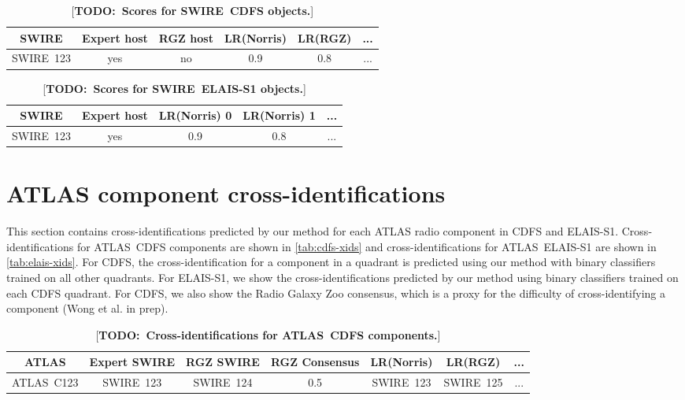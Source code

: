 \documentclass[fleqn,usenatbib,usedcolumn]{mnras}
\newcommand{\todo}[1]{ {\color{red}[{\bf TODO:~{#1}}]} }
\begin{document}
  \begin{table}
    \caption{\todo{Scores for SWIRE~CDFS objects.}}
    \label{tab:cdfs-scores}
    \begin{tabular}{cccccc}
      \hline
      SWIRE & Expert host & RGZ host & LR(Norris) & LR(RGZ) & ... \\
      \hline
      SWIRE~123 & yes & no & 0.9 & 0.8 & ... \\
      \hline
    \end{tabular}
  \end{table}

  \begin{table}
    \caption{\todo{Scores for SWIRE~ELAIS-S1 objects.}}
    \label{tab:elais-scores}
    \begin{tabular}{ccccc}
      \hline
      SWIRE & Expert host & LR(Norris) 0 & LR(Norris) 1 & ... \\
      \hline
      SWIRE~123 & yes & 0.9 & 0.8 & ... \\
      \hline
    \end{tabular}
  \end{table}

\section{ATLAS component cross-identifications}\label{app:xids}
  
  This section contains cross-identifications predicted by our method for each
  ATLAS radio component in CDFS and ELAIS-S1. Cross-identifications for
  ATLAS~CDFS components are shown in \autoref{tab:cdfs-xids} and
  cross-identifications for ATLAS~ELAIS-S1 are shown in
  \autoref{tab:elais-xids}. For CDFS, the cross-identification for a component
  in a quadrant is predicted using our method with binary classifiers trained
  on all other quadrants. For ELAIS-S1, we show the cross-identifications
  predicted by our method using binary classifiers trained on each CDFS
  quadrant. For CDFS, we also show the Radio Galaxy Zoo consensus, which is a
  proxy for the difficulty of cross-identifying a component (Wong et al. in
  prep).

  \begin{table}
    \caption{\todo{Cross-identifications for ATLAS~CDFS components.}}
    \label{tab:cdfs-xids}
    \begin{tabular}{ccccccc}
      \hline
      ATLAS & Expert SWIRE & RGZ SWIRE & RGZ Consensus & LR(Norris) & LR(RGZ) & ... \\
      \hline
      ATLAS~C123 & SWIRE~123 & SWIRE~124 & 0.5 & SWIRE~123 & SWIRE~125 & ... \\
      \hline
    \end{tabular}
  \end{table}
\end{document}

